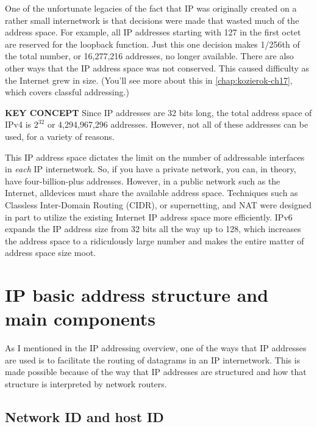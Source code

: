 One of the unfortunate legacies of the fact that IP was originally
created on a rather small internetwork is that decisions were made that
wasted much of the address space. For example, all IP addresses starting
with 127 in the first octet are reserved for the loopback function. Just
this one decision makes 1/256th of the total number, or 16,277,216
addresses, no longer available. There are also other ways that the IP
address space was not conserved. This caused difficulty as the Internet
grew in size. (You'll see more about this in \vref{chap:kozierok-ch17}, which covers classful addressing.)


{\textbf{KEY CONCEPT}} Since IP addresses are 32 bits long, the total
address space of IPv4 is $2^{32}$ or 4,294,967,296 addresses.
However, not all of these addresses can be used, for a variety of reasons.

This IP address space dictates the limit on the number of addressable
interfaces in {\emph{each}} IP internetwork. So, if you have a private
network, you can, in theory, have four-billion-plus addresses. However,
in a public network such as the Internet, alldevices must share the
available address space. Techniques such as Classless Inter-Domain
Routing (CIDR), or supernetting, and NAT were designed in part to
utilize the existing Internet IP address space more efficiently. IPv6
expands the IP address size from 32 bits all the way up to 128, which
increases the address space to a ridiculously large number and makes the
entire matter of address space size moot.



\section{IP basic address structure and main components}

As I mentioned in the IP addressing overview, one of the ways that IP
addresses are used is to facilitate the routing of datagrams in an IP
internetwork. This is made possible because of the way that IP addresses
are structured and how that structure is interpreted by network routers.



\subsection{Network ID and host ID}

